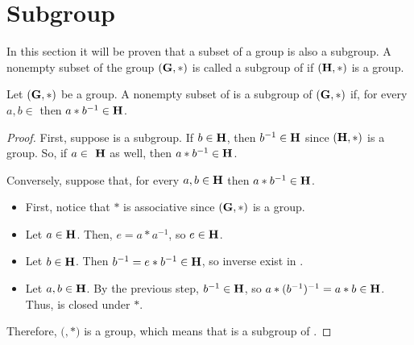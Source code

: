 \section{Subgroup}
\label{sec:subgroup}
In this section it will be proven that a subset of a group is also a subgroup.
A nonempty subset  of the group $(\textbf{G},*)$ is called a subgroup of  if $(\textbf{H},*)$ is a group.

Let $(\textbf{G},*)$ be a group. A nonempty subset  of  is a subgroup of $(\textbf{G},*)$ if, for every $a, b \in $ then $a * b^{-1} \in  \textbf{H}$.

\begin{proof}
First, suppose  is a subgroup. If $b \in \textbf{H}$, then $b^{-1} \in \textbf{H}$ since $ (\textbf{H},*)$ is a group. So, if $a \in \m{ H}$ as well, then $a * b^{-1} \in \textbf{H}$.

Conversely, suppose that, for every $a, b \in \textbf{H}$ then $a * b^{-1} \in \textbf{H}$.

\begin {itemize}
\item First, notice that $*$ is associative since $(\textbf{G},*)$ is a group.
\item Let $a \in \m{H}$. Then, $e = a * a^{-1}$, so $e \in \textbf{H}$.
\item Let $b \in \textbf{H}$. Then $b^{-1} = e * b^{-1} \in \textbf{H}$, so inverse exist in .
\item Let $a, b \in \textbf{H}$. By the previous step, $b^{-1} \in \textbf{H}$, so $a* (b^{-1})^{-1} = a* b \in \textbf{H}$. Thus,  is closed under $*$.
\end {itemize}

Therefore, $($$,*)$ is a group, which means that  is a subgroup of .
\end{proof}

